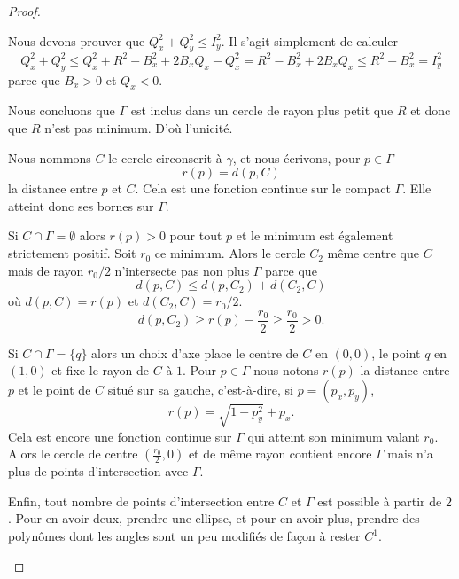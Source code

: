 \begin{proof}
\begin{subproof}
		Nous devons prouver que \( Q_x^2+Q_y^2\leq I_y^2\). Il s'agit simplement de calculer
		\begin{equation}
			Q_x^2+Q_y^2\leq Q_x^2+R^2-B_x^2+2B_xQ_x-Q_x^2=R^2-B_x^2+2B_xQ_x\leq R^2-B_x^2=I_y^2
		\end{equation}
		parce que \( B_x>0\) et \( Q_x<0\).

		Nous concluons que \( \Gamma\) est inclus dans un cercle de rayon plus petit que \( R\) et donc que \( R\) n'est pas minimum. D'où l'unicité.


		Nous nommons \( C\) le cercle circonscrit à \( \gamma\), et nous écrivons, pour \( p\in \Gamma\)
		\begin{equation}
			r(p)=d(p,C)
		\end{equation}
		la distance entre \( p\) et \( C\). Cela est une fonction continue sur le compact \( \Gamma\). Elle atteint donc ses bornes sur \( \Gamma\).

		Si \( C\cap \Gamma=\emptyset\) alors \( r(p)>0\) pour tout \( p\) et le minimum est également strictement positif. Soit \( r_0\) ce minimum. Alors le cercle \( C_2\) même centre que \( C\) mais de rayon \( r_0/2\) n'intersecte pas non plus \( \Gamma\) parce que
		\begin{equation}
			d(p,C)\leq d(p,C_2)+d(C_2,C)
		\end{equation}
		où \( d(p,C)=r(p)\) et \( d(C_2,C)=r_0/2\).
		\begin{equation}
			d(p,C_2)\geq r(p)-\frac{ r_0 }{2}\geq \frac{ r_0 }{2}>0.
		\end{equation}

		Si \( C\cap \Gamma=\{ q \}\) alors un choix d'axe place le centre de \( C\) en \( (0,0)\), le point \( q\) en \( (1,0)\) et fixe le rayon de \( C\) à \( 1\). Pour \( p\in \Gamma\) nous notons \( r(p)\) la distance entre \( p\) et le point de \( C\) situé sur sa gauche, c'est-à-dire, si \( p=(p_x,p_y)\),
		\begin{equation}
			r(p)=\sqrt{ 1-p_y^2 }+p_x.
		\end{equation}
		Cela est encore une fonction continue sur \( \Gamma\) qui atteint son minimum valant \( r_0\). Alors le cercle de centre \( (\frac{ r_0 }{2},0)\) et de même rayon contient encore \( \Gamma\) mais n'a plus de points d'intersection avec \( \Gamma\).

		Enfin, tout nombre de points d'intersection entre \( C\) et \( \Gamma\) est possible à partir de \( 2\). Pour en avoir deux, prendre une ellipse, et pour en avoir plus, prendre des polynômes dont les angles sont un peu modifiés de façon à rester \( C^1\).


\end{subproof}
\end{proof}
